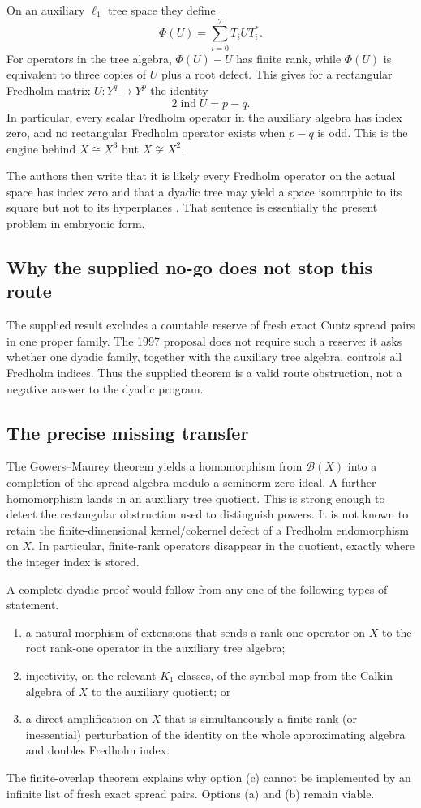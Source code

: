 \documentclass[11pt]{article}
\theoremstyle{definition}
\theoremstyle{remark}
\newcommand{\B}{\mathcal B}
\newcommand{\ind}{\operatorname{ind}}
\begin{document}
On an auxiliary $\ell_1$ tree space they define
\[
 \Phi(U)=\sum_{i=0}^2 T_iUT_i^*.
\]
For operators in the tree algebra, $\Phi(U)-U$ has finite rank, while
$\Phi(U)$ is equivalent to three copies of $U$ plus a root defect.  This gives
for a rectangular Fredholm matrix $U:Y^q\to Y^p$ the identity
\[
 2\ind U=p-q.
\]
In particular, every scalar Fredholm operator in the auxiliary algebra has
index zero, and no rectangular Fredholm operator exists when $p-q$ is odd.
This is the engine behind $X\cong X^3$ but $X\not\cong X^2$.

The authors then write that it is likely every Fredholm operator on the actual
space has index zero and that a dyadic tree may yield a space isomorphic to its
square but not to its hyperplanes \cite[Section 4.4]{GowersMaurey1997}.
That sentence is essentially the present problem in embryonic form.

\subsection{Why the supplied no-go does not stop this route}

The supplied result excludes a countable reserve of fresh exact Cuntz spread
pairs in one proper family.  The 1997 proposal does not require such a reserve:
it asks whether one dyadic family, together with the auxiliary tree algebra,
controls all Fredholm indices.  Thus the supplied theorem is a valid route
obstruction, not a negative answer to the dyadic program.

\subsection{The precise missing transfer}

The Gowers--Maurey theorem yields a homomorphism from $\B(X)$ into a completion
of the spread algebra modulo a seminorm-zero ideal.  A further homomorphism
lands in an auxiliary tree quotient.  This is strong enough to detect the
rectangular obstruction used to distinguish powers.  It is not known to retain
the finite-dimensional kernel/cokernel defect of a Fredholm endomorphism on
$X$.  In particular, finite-rank operators disappear in the quotient, exactly
where the integer index is stored.

A complete dyadic proof would follow from any one of the following types of
statement.
\begin{enumerate}[label=\textup{(\alph*)},leftmargin=2em]
\item a natural morphism of extensions that sends a rank-one operator on $X$ to
the root rank-one operator in the auxiliary tree algebra;
\item injectivity, on the relevant $K_1$ classes, of the symbol map from the
Calkin algebra of $X$ to the auxiliary quotient; or
\item a direct amplification on $X$ that is simultaneously a finite-rank (or
inessential) perturbation of the identity on the whole approximating algebra
and doubles Fredholm index.
\end{enumerate}
The finite-overlap theorem explains why option (c) cannot be implemented by an
infinite list of fresh exact spread pairs.  Options (a) and (b) remain viable.
\end{document}
